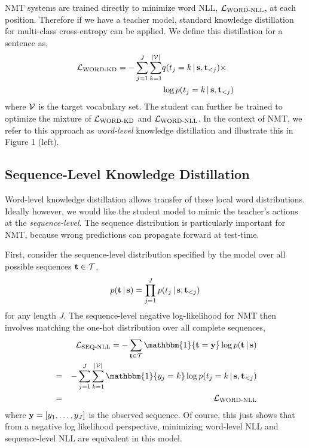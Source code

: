 \documentclass[11pt,letterpaper]{article}
\begin{document}
NMT systems are trained directly to minimize word NLL,
$\mathcal{L}_{\text{WORD-NLL}}$, at each position. Therefore 
if we have a teacher model, standard knowledge distillation 
for multi-class cross-entropy can be applied.
We define this distillation for a sentence as,
\begin{eqnarray*}
\mathcal{L}_{\text{WORD-KD}} = -\sum_{j=1}^{J} \sum_{k=1}^{|\mathcal{V}|} &q(t_{j}=k \,|\, \mathbf{s}, \mathbf{t}_{<j}) \times \\
&\log p(t_{j}=k \,|\, \mathbf{s}, \mathbf{t}_{<j})
\end{eqnarray*}
where $\mathcal{V}$ is the target vocabulary set. The student can further be trained to  optimize the
mixture of $\mathcal{L}_{\text{WORD-KD}}$ and $\mathcal{L}_{\text{WORD-NLL}}$.  In
the context of NMT, we refer to this approach as \textit{word-level}
knowledge distillation and illustrate this in Figure 1 (left).


\subsection{Sequence-Level Knowledge Distillation}

Word-level knowledge distillation allows transfer of these local word
distributions. Ideally however, we would like the student model to mimic the
teacher's actions at the \textit{sequence-level}.  The sequence
distribution is particularly important for NMT, because wrong
predictions can propagate forward at test-time.

First, consider the sequence-level distribution specified by the model over all
possible sequences $\mathbf{t} \in \mathcal{T}$,
\begin{equation*}
p(\mathbf{t} \,|\, \mathbf{s}) = \prod_{j=1}^J p(t_j \,|\, \mathbf{s}, \mathbf{t}_{<j})
\end{equation*}
for any length $J$.
The sequence-level negative log-likelihood for NMT then involves matching
the one-hot distribution over all complete sequences,
\begin{eqnarray*}
&&\mcL_{\text{SEQ-NLL}} = -\sum_{\tvec \in \mcT} \mathbbm{1}\{\tvec=\yvec\} \log p(\tvec \given \svec) \\ 
&= & -\sum_{j=1}^J \sum_{k=1}^{|\mcV|} \mathbbm{1}\{y_j=k\} \log p(t_{j}=k \given \svec, \tvec_{<j}) 
\\ 
&=& \mcL_{\text{WORD-NLL}}
\end{eqnarray*}
where $\mathbf{y} = [y_1, \dots, y_J]$ is the observed sequence.
Of course, this just shows that from a negative log likelihood perspective,
 minimizing word-level NLL and sequence-level NLL are equivalent in this model.
\end{document}
